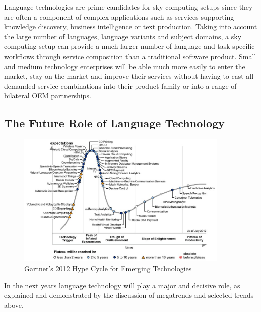 \documentclass[10pt, plain]{../../metanetpaper}
\begin{document}
\begin{multicols}{2}
Language technologies are prime candidates for sky computing setups since they are often a component of complex applications such as services supporting knowledge discovery, business intelligence or text production. Taking into account the large number of languages, language variants and subject domains, a sky computing setup can provide a much larger number of language and task-specific workflows through service composition than a traditional software product. Small and medium technology enterprises will be able much more easily to enter the market, stay on the market and improve their services without having to cast all demanded service combinations into their product family or into a range of bilateral OEM partnerships.

\subsection[The Future Role of Language Technology]{The Future Role of Language Technology}
\label{sec:}

\begin{figure}[htb]
  \center
  \includegraphics[width=0.9\textwidth]{../_media/Gartner-2012-Hype-Cycle.jpeg}
  \caption{Gartner's 2012 Hype Cycle for Emerging Technologies \cite{gartner2012}}
  \label{fig:hype-cycle}
\end{figure}


In the next years language technology will play a major and decisive role, as explained and demonstrated by the discussion of megatrends and selected trends above. 


\end{multicols}
\end{document}
